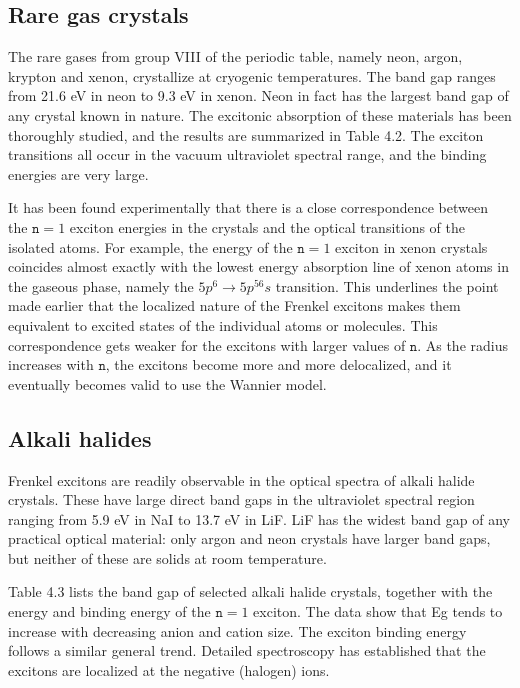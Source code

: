 \documentclass[12pt]{book}
\begin{document}
\subsection{Rare gas crystals}

The rare gases from group VIII of the periodic table, namely neon, argon, krypton and xenon, crystallize at cryogenic temperatures. The band gap ranges from 21.6 eV in neon to 9.3 eV in xenon. Neon in fact has the largest band gap of any crystal known in nature. The excitonic absorption of these materials has been thoroughly studied, and the results are summarized in Table 4.2. The exciton transitions all occur in the vacuum ultraviolet spectral range, and the binding energies are very large.

It has been found experimentally that there is a close correspondence between the $\texttt{n} = 1$ exciton energies in the crystals and the optical transitions of the isolated atoms. For example, the energy of the $\texttt{n} = 1$ exciton in xenon crystals coincides almost exactly with the lowest energy absorption line of xenon atoms in the gaseous phase, namely the $5p^6\rightarrow5p^56s$ transition. This underlines the point made earlier that the localized nature of the Frenkel excitons makes them equivalent to excited states of the individual atoms or molecules. This correspondence gets weaker for the excitons with larger values of $\texttt{n}$. As the radius increases with $\texttt{n}$, the excitons become more and more delocalized, and it eventually becomes valid to use the Wannier model.

\subsection{Alkali halides}

Frenkel excitons are readily observable in the optical spectra of alkali halide crystals. These have large direct band gaps in the ultraviolet spectral region ranging from 5.9 eV in NaI to 13.7 eV in LiF. LiF has the widest band gap of any practical optical material: only argon and neon crystals have larger band gaps, but neither of these are solids at room temperature.

Table 4.3 lists the band gap of selected alkali halide crystals, together with the energy and binding energy of the $\texttt{n}=1$ exciton. The data show that Eg tends to increase with decreasing anion and cation size. The exciton binding energy follows a similar general trend. Detailed spectroscopy has established that the excitons are localized at the negative (halogen) ions.
\end{document}
